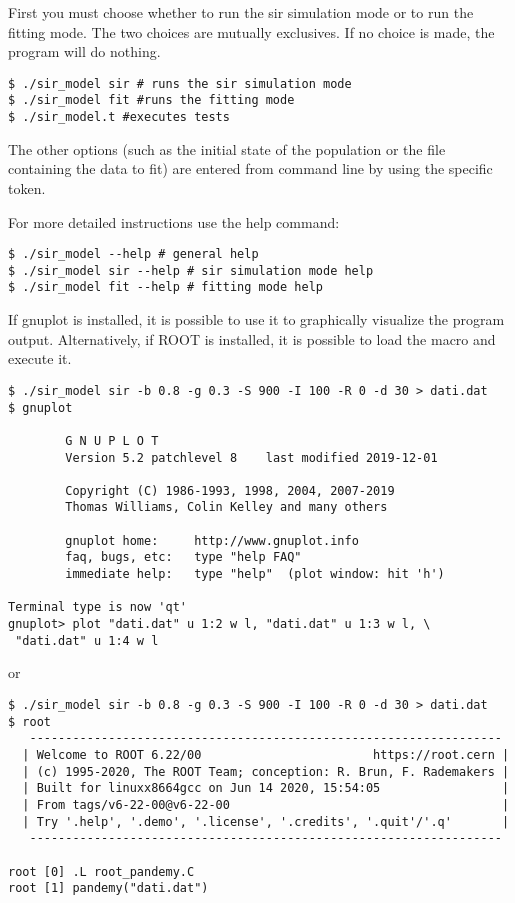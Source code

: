 First you must choose whether to run the sir simulation mode or to run the fitting mode. The two choices are 
mutually exclusives. If no choice is made, the program will do nothing.
\begin{verbatim}
$ ./sir_model sir # runs the sir simulation mode
$ ./sir_model fit #runs the fitting mode
$ ./sir_model.t #executes tests
\end{verbatim}
The other options (such as the initial state of the population or the file containing the data to fit) are 
entered from command line by using the specific token.

For more detailed instructions use the help command:
\begin{verbatim}
$ ./sir_model --help # general help
$ ./sir_model sir --help # sir simulation mode help
$ ./sir_model fit --help # fitting mode help
\end{verbatim}

If gnuplot is installed, it is possible to use it to graphically visualize the program output. Alternatively, if 
ROOT is installed, it is possible to load the macro and execute it.
\begin{verbatim}
$ ./sir_model sir -b 0.8 -g 0.3 -S 900 -I 100 -R 0 -d 30 > dati.dat
$ gnuplot

        G N U P L O T
        Version 5.2 patchlevel 8    last modified 2019-12-01

        Copyright (C) 1986-1993, 1998, 2004, 2007-2019
        Thomas Williams, Colin Kelley and many others

        gnuplot home:     http://www.gnuplot.info
        faq, bugs, etc:   type "help FAQ"
        immediate help:   type "help"  (plot window: hit 'h')

Terminal type is now 'qt'
gnuplot> plot "dati.dat" u 1:2 w l, "dati.dat" u 1:3 w l, \
 "dati.dat" u 1:4 w l
\end{verbatim} or 
\begin{verbatim}
$ ./sir_model sir -b 0.8 -g 0.3 -S 900 -I 100 -R 0 -d 30 > dati.dat
$ root
   ------------------------------------------------------------------
  | Welcome to ROOT 6.22/00                        https://root.cern |
  | (c) 1995-2020, The ROOT Team; conception: R. Brun, F. Rademakers |
  | Built for linuxx8664gcc on Jun 14 2020, 15:54:05                 |
  | From tags/v6-22-00@v6-22-00                                      |
  | Try '.help', '.demo', '.license', '.credits', '.quit'/'.q'       |
   ------------------------------------------------------------------

root [0] .L root_pandemy.C
root [1] pandemy("dati.dat")
\end{verbatim}

